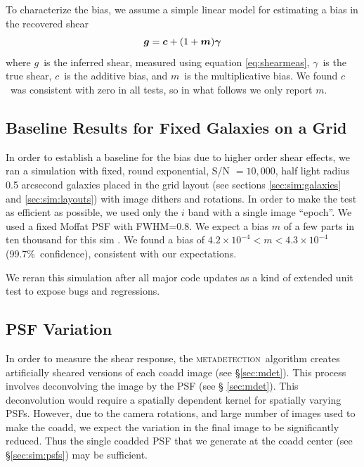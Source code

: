 \documentclass[twocolumn,twocolappendix,astrosym]{openjournal}
\newcommand{\vecg}{\mbox{\boldmath $g$}}
\newcommand{\vecc}{\mbox{\boldmath $c$}}
\newcommand{\vecm}{\mbox{\boldmath $m$}}
\newcommand{\mdet}{\textsc{metadetection}}
\newcommand{\vecgam}{\mbox{\boldmath $\gamma$}}
\begin{document}
To characterize the bias, we assume a simple linear model \citep[see,
e.g.,][]{heymans2006} for estimating a bias in the recovered shear
\begin{equation} \label{eq:m}
\vecg = \vecc + (1 + \vecm) \vecgam
\end{equation}
where \vecg\ is the inferred shear, measured using equation \ref{eq:shearmeas},
\vecgam\ is the true shear, \vecc\ is the additive bias, and \vecm\ is the
multiplicative bias. We found \vecc\ was consistent with zero in all tests, so
in what follows we only report \vecm.

\subsection{Baseline Results for Fixed Galaxies on a Grid} \label{sec:results:base}

In order to establish a baseline for the bias due to higher order shear
effects, we ran a simulation with fixed, round exponential, S/N $= 10,000$,
half light radius 0.5 arcsecond galaxies placed in the grid layout (see
sections \ref{sec:sim:galaxies} and \ref{sec:sim:layouts}) with image dithers
and rotations.  In order to make the test as efficient as possible, we used
only the $i$ band with a single image ``epoch''.  We used a fixed Moffat
PSF\citep{Moffat1969} with FWHM=0.8.  We expect a bias $m$ of a few parts in
ten thousand for this sim \citep{SheldonMcal2017}.  We found a bias of
$4.2\times 10^{-4} < m < 4.3\times 10^{-4}$ (99.7\%~confidence), consistent
with our expectations.

We reran this simulation after all major code updates as a kind of extended
unit test to expose bugs and regressions.

\subsection{PSF Variation} \label{sec:results:psfvar}

In order to measure the shear response, the \mdet\ algorithm creates
artificially sheared versions of each coadd image (see \S \ref{sec:mdet}).
This process involves deconvolving the image by the PSF (see \S
\ref{sec:mdet}).  This deconvolution would require a spatially dependent kernel
for spatially varying PSFs.  However, due to the camera rotations, and large
number of images used to make the coadd, we expect the variation in the final
image to be significantly reduced.  Thus the single coadded PSF that we
generate at the coadd center (see \S \ref{sec:sim:psfs}) may be sufficient.
\end{document}
